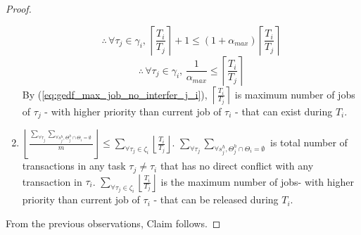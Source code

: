 \begin{proof}
\begin{enumerate}
\[\]
\[
\therefore\,\forall\tau_{j}\in\gamma_{i},\,\left\lceil \frac{T_{i}}{T_{j}}\right\rceil +1\le\left(1+\alpha_{max}\right)\left\lceil \frac{T_{i}}{T_{j}}\right\rceil 
\]
\[
\therefore\,\forall\tau_{j}\in\gamma_{i},\,\frac{1}{\alpha_{max}}\le\left\lceil \frac{T_{i}}{T_{j}}\right\rceil 
\]
By (\ref{eq:gedf_max_job_no_interfer_j_i}), $\left\lceil \frac{T_{i}}{T_{j}}\right\rceil $
is maximum number of jobs of $\tau_{j}$ - with higher priority than
current job of $\tau_{i}$ - that can exist during $T_{i}$.
%
\item $\left\lfloor \frac{\sum_{\forall\tau_{j}}\sum_{\forall s_{j}^{h},\Theta_{j}^{h}\cap\Theta_{i}=\emptyset}}{m}\right\rfloor \le\sum_{\forall\tau_{j}\in\zeta_{i}}\left\lfloor \frac{T_{i}}{T_{j}}\right\rfloor $.
$\sum_{\forall\tau_{j}}\sum_{\forall s_{j}^{h},\Theta_{j}^{h}\cap\Theta_{i}=\emptyset}$
is total number of transactions in any task $\tau_{j}\neq\tau_{i}$
that has no direct conflict with any transaction in $\tau_{i}$. $\sum_{\forall\tau_{j}\in\zeta_{i}}\left\lfloor \frac{T_{i}}{T_{j}}\right\rfloor $
is the maximum number of jobs- with higher priority than current job
of $\tau_{i}$ - that can be released during $T_{i}$.
\end{enumerate}
%
From the previous observations, Claim follows.
%
\end{proof}
%
